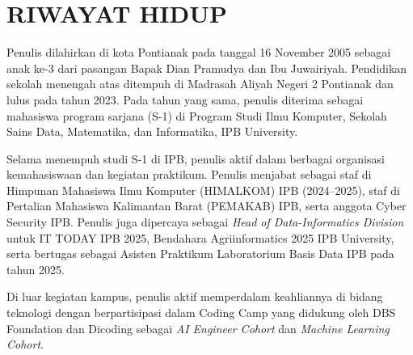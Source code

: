 
\chapter*{RIWAYAT HIDUP}

Penulis dilahirkan di kota Pontianak pada tanggal 16 November 2005 sebagai anak ke-3 dari pasangan Bapak Dian Pramudya dan Ibu Juwairiyah. Pendidikan sekolah menengah atas ditempuh di Madrasah Aliyah Negeri 2 Pontianak dan lulus pada tahun 2023. Pada tahun yang sama, penulis diterima sebagai mahasiswa program sarjana (S-1) di Program Studi Ilmu Komputer, Sekolah Sains Data, Matematika, dan Informatika, IPB University.

Selama menempuh studi S-1 di IPB, penulis aktif dalam berbagai organisasi kemahasiswaan dan kegiatan praktikum. Penulis menjabat sebagai staf di Himpunan Mahasiswa Ilmu Komputer (HIMALKOM) IPB (2024--2025), staf di Pertalian Mahasiswa Kalimantan Barat (PEMAKAB) IPB, serta anggota Cyber Security IPB. Penulis juga dipercaya sebagai \textit{Head of Data-Informatics Division} untuk IT TODAY IPB 2025, Bendahara Agriinformatics 2025 IPB University, serta bertugas sebagai Asisten Praktikum Laboratorium Basis Data IPB pada tahun 2025.

Di luar kegiatan kampus, penulis aktif memperdalam keahliannya di bidang teknologi dengan berpartisipasi dalam Coding Camp yang didukung oleh DBS Foundation dan Dicoding sebagai \textit{AI Engineer Cohort} dan \textit{Machine Learning Cohort}.
